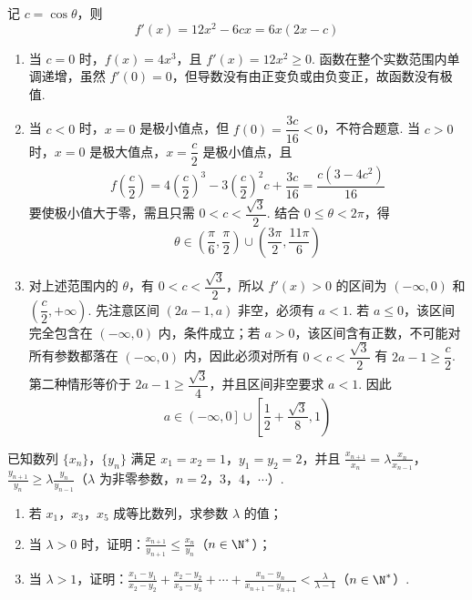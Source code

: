 \begin{solution}
记 \(c=\cos\theta\)，则
\[
f'(x)=12x^{2}-6cx=6x(2x-c)
\]
\begin{enumerate}
\item 当 \(c=0\) 时，\(f(x)=4x^{3}\)，且 \(f'(x)=12x^{2}\geqslant0\). 函数在整个实数范围内单调递增，虽然 \(f'(0)=0\)，但导数没有由正变负或由负变正，故函数没有极值.
\item 当 \(c<0\) 时，\(x=0\) 是极小值点，但 \(f(0)=\dfrac{3c}{16}<0\)，不符合题意. 当 \(c>0\) 时，\(x=0\) 是极大值点，\(x=\dfrac{c}{2}\) 是极小值点，且
\[
f\left(\frac{c}{2}\right)=4\left(\frac{c}{2}\right)^{3}-3\left(\frac{c}{2}\right)^{2}c+\frac{3c}{16}=\frac{c(3-4c^{2})}{16}
\]
要使极小值大于零，需且只需 \(0<c<\dfrac{\sqrt3}{2}\). 结合 \(0\leqslant\theta<2\pi\)，得
\[
\theta\in\left(\frac{\pi}{6},\frac{\pi}{2}\right)\cup\left(\frac{3\pi}{2},\frac{11\pi}{6}\right)
\]
\item 对上述范围内的 \(\theta\)，有 \(0<c<\dfrac{\sqrt3}{2}\)，所以 \(f'(x)>0\) 的区间为 \(\left(-\infty,0\right)\) 和 \(\left(\dfrac{c}{2},+\infty\right)\). 先注意区间 \((2a-1,a)\) 非空，必须有 \(a<1\). 若 \(a\leqslant0\)，该区间完全包含在 \(\left(-\infty,0\right)\) 内，条件成立；若 \(a>0\)，该区间含有正数，不可能对所有参数都落在 \(\left(-\infty,0\right)\) 内，因此必须对所有 \(0<c<\dfrac{\sqrt3}{2}\) 有 \(2a-1\geqslant\dfrac{c}{2}\).
第二种情形等价于 \(2a-1\geqslant\dfrac{\sqrt3}{4}\)，并且区间非空要求 \(a<1\). 因此
\[
a\in\left(-\infty,0\right]\cup\left[\frac12+\frac{\sqrt3}{8},1\right)
\]
\end{enumerate}
\end{solution}

\begin{problem}
已知数列 \(\{x_{n}\}\)，\(\{y_{n}\}\) 满足 \(x_{1}=x_{2}=1\)，\(y_{1}=y_{2}=2\)，并且 \(\frac{x_{n+1}}{x_n}=\lambda\frac{x_n}{x_{n-1}}\)，\(\frac{y_{n+1}}{y_n}\geqslant\lambda\frac{y_n}{y_{n-1}}\)（\(\lambda\) 为非零参数，\(n=2\)，\(3\)，\(4\)，\(\cdots\)）.

\begin{enumerate}
\item 若 \(x_{1}\)，\(x_{3}\)，\(x_{5}\) 成等比数列，求参数 \(\lambda\) 的值；
\item 当 \(\lambda>0\) 时，证明：\(\frac{x_{n+1}}{y_{n+1}}\leqslant\frac{x_n}{y_n}\)（\(n\in\N^{*}\)）；
\item 当 \(\lambda>1\)，证明：\(\frac{x_{1}-y_{1}}{x_{2}-y_{2}}+\frac{x_{2}-y_{2}}{x_{3}-y_{3}}+\cdots+\frac{x_{n}-y_{n}}{x_{n+1}-y_{n+1}}<\frac{\lambda}{\lambda-1}\)（\(n\in\N^{*}\)）.
\end{enumerate}
\end{problem}


